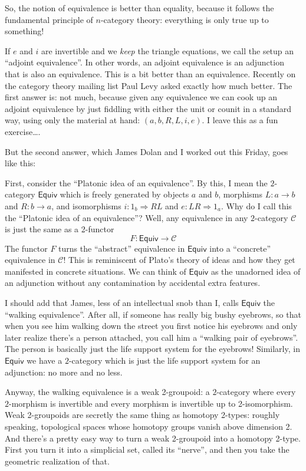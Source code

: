 \documentclass{article}
\begin{document}
So, the notion of equivalence is better than equality, because it
follows the fundamental principle of \(n\)-category theory: everything
is only true up to something!

If \(e\) and \(i\) are invertible and we \emph{keep} the triangle
equations, we call the setup an ``adjoint equivalence''. In other words,
an adjoint equivalence is an adjunction that is also an equivalence.
This is a bit better than an equivalence. Recently on the category
theory mailing list Paul Levy asked exactly how much better. The first
answer is: not much, because given any equivalence we can cook up an
adjoint equivalence by just fiddling with either the unit or counit in a
standard way, using only the material at hand: \((a,b,R,L,i,e)\). I
leave this as a fun exercise\ldots.

But the second answer, which James Dolan and I worked out this Friday,
goes like this:

First, consider the ``Platonic idea of an equivalence''. By this, I mean
the \(2\)-category \(\mathsf{Equiv}\) which is freely generated by
objects \(a\) and \(b\), morphisms \(L\colon a \to b\) and
\(R\colon b \to a\), and isomorphisms \(i\colon 1_b \Rightarrow RL\) and
\(e\colon LR \Rightarrow 1_a\). Why do I call this the ``Platonic idea
of an equivalence''? Well, any equivalence in any \(2\)-category
\(\mathcal{C}\) is just the same as a 2-functor
\[F\colon \mathsf{Equiv} \to \mathcal{C}\] The functor \(F\) turns the
``abstract'' equivalence in \(\mathsf{Equiv}\) into a ``concrete''
equivalence in \(\mathcal{C}\)! This is reminiscent of Plato's theory of
ideas and how they get manifested in concrete situations. We can think
of \(\mathsf{Equiv}\) as the unadorned idea of an adjunction without any
contamination by accidental extra features.

I should add that James, less of an intellectual snob than I, calls
\(\mathsf{Equiv}\) the ``walking equivalence''. After all, if someone
has really big bushy eyebrows, so that when you see him walking down the
street you first notice his eyebrows and only later realize there's a
person attached, you call him a ``walking pair of eyebrows''. The person
is basically just the life support system for the eyebrows! Similarly,
in \(\mathsf{Equiv}\) we have a \(2\)-category which is just the life
support system for an adjunction: no more and no less.

Anyway, the walking equivalence is a weak 2-groupoid: a \(2\)-category
where every \(2\)-morphism is invertible and every morphism is
invertible up to 2-isomorphism. Weak 2-groupoids are secretly the same
thing as homotopy 2-types: roughly speaking, topological spaces whose
homotopy groups vanish above dimension 2. And there's a pretty easy way
to turn a weak 2-groupoid into a homotopy 2-type. First you turn it into
a simplicial set, called its ``nerve'', and then you take the geometric
realization of that.
\end{document}
